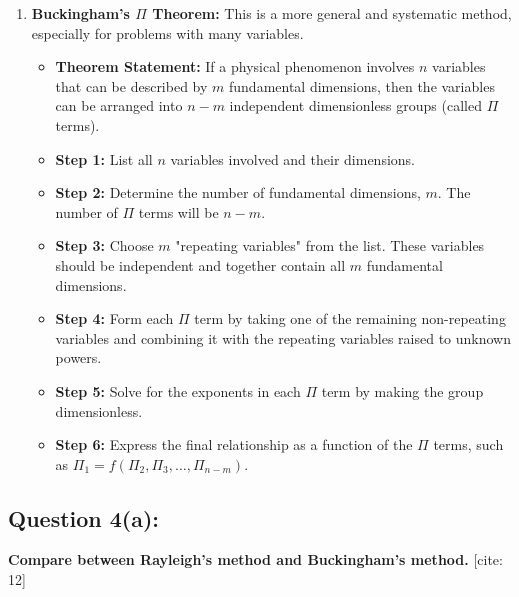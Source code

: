 \documentclass{article}
\begin{document}
\begin{enumerate}
    \item \textbf{Buckingham's $\Pi$ Theorem:} This is a more general and systematic method, especially for problems with many variables.
    \begin{itemize}
        \item \textbf{Theorem Statement:} If a physical phenomenon involves $n$ variables that can be described by $m$ fundamental dimensions, then the variables can be arranged into $n-m$ independent dimensionless groups (called $\Pi$ terms).
        \item \textbf{Step 1:} List all $n$ variables involved and their dimensions.
        \item \textbf{Step 2:} Determine the number of fundamental dimensions, $m$. The number of $\Pi$ terms will be $n-m$.
        \item \textbf{Step 3:} Choose $m$ "repeating variables" from the list. These variables should be independent and together contain all $m$ fundamental dimensions.
        \item \textbf{Step 4:} Form each $\Pi$ term by taking one of the remaining non-repeating variables and combining it with the repeating variables raised to unknown powers.
        \item \textbf{Step 5:} Solve for the exponents in each $\Pi$ term by making the group dimensionless.
        \item \textbf{Step 6:} Express the final relationship as a function of the $\Pi$ terms, such as $\Pi_1 = f(\Pi_2, \Pi_3, \dots, \Pi_{n-m})$.
    \end{itemize}
\end{enumerate}
\hrulefill

\subsection*{\textbf{Question 4(a):}}
\textbf{Compare between Rayleigh's method and Buckingham's method.} [cite: 12]
\end{document}
